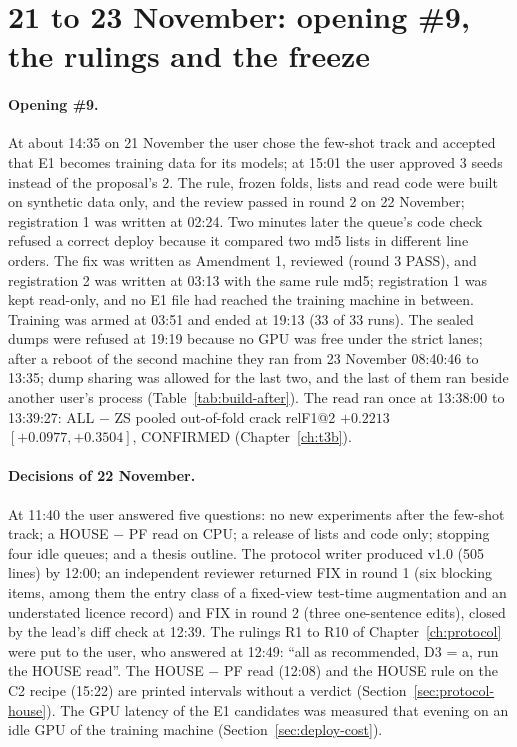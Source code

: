 \section{21 to 23 November: opening \#9, the rulings and the freeze}\label{sec:build-freeze}

\paragraph{Opening \#9.} At about 14:35 on 21 November the user chose the few-shot track and accepted that E1 becomes training data
for its models; at 15:01 the user approved 3 seeds instead of the proposal's 2. The rule, frozen folds, lists and read code were
built on synthetic data only, and the review passed in round 2 on 22 November; registration 1 was written at 02:24. Two minutes
later the queue's code check refused a correct deploy because it compared two md5 lists in different line orders. The fix was
written as Amendment 1, reviewed (round 3 PASS), and registration 2 was written at 03:13 with the same rule md5; registration 1 was
kept read-only, and no E1 file had reached the training machine in between. Training was armed at 03:51 and ended at 19:13 (33 of
33 runs). The sealed dumps were refused at 19:19 because no GPU was free under the strict lanes; after a reboot of the second
machine they ran from 23 November 08:40:46 to 13:35; dump sharing was allowed for the last two, and the last of them ran beside
another user's process (Table~\ref{tab:build-after}). The
read ran once at 13:38:00 to 13:39:27: ALL $-$ ZS pooled out-of-fold crack relF1@2 $+0.2213$ $[+0.0977, +0.3504]$, CONFIRMED
(Chapter~\ref{ch:t3b}).

\paragraph{Decisions of 22 November.} At 11:40 the user answered five questions: no new experiments after the few-shot track; a
HOUSE $-$ PF read on CPU; a release of lists and code only; stopping four idle queues; and a thesis outline. The protocol writer
produced v1.0 (505 lines) by 12:00; an independent reviewer returned FIX in round 1 (six blocking items, among them the entry class
of a fixed-view test-time augmentation and an understated licence record) and FIX in round 2 (three one-sentence edits), closed by
the lead's diff check at 12:39. The rulings R1 to R10 of Chapter~\ref{ch:protocol} were put to the user, who answered at 12:49:
``all as recommended, D3 = a, run the HOUSE read''. The HOUSE $-$ PF read (12:08) and the HOUSE rule on the C2 recipe (15:22) are
printed intervals without a verdict (Section~\ref{sec:protocol-house}). The GPU latency of the E1 candidates was measured that
evening on an idle GPU of the training machine (Section~\ref{sec:deploy-cost}).

